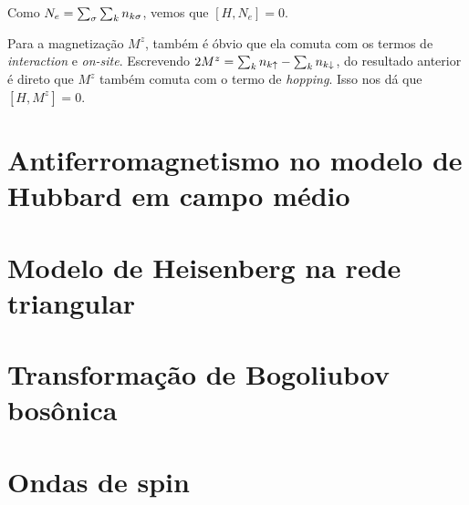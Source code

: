 \documentclass[a4paper,10pt]{article}
\begin{document}
Como $N_e = \sum_{\sigma} \sum_{k} n_{k\sigma}$, vemos que $[H, N_e] = 0$.

\n

Para a magnetização $M^z$, também é óbvio que ela comuta com os termos de \textit{interaction} e \textit{on-site}. Escrevendo $2 M^z = \sum_{k} n_{k\uparrow} - \sum_{k} n_{k\downarrow}$, do resultado anterior é direto que $M^z$ também comuta com o termo de \textit{hopping}. Isso nos dá que $[H, M^z] = 0$.

\pagebreak

\section{Antiferromagnetismo no modelo de Hubbard em campo médio}


\pagebreak

\section{Modelo de Heisenberg na rede triangular}


\pagebreak

\section{Transformação de Bogoliubov bosônica}



\pagebreak

\section{Ondas de spin}
\end{document}
